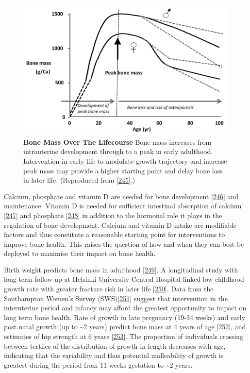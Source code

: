 \documentclass[
]{book}
\begin{document}
\begin{figure}

{\centering \includegraphics[width=0.8\linewidth]{figs/Harvey2014bfig1} 

}

\caption{\textbf{Bone Mass Over The Lifecourse} Bone mass increases from intrauterine development through to a peak in early adulthood. Intervention in early life to modulate growth trajectory and increase peak mass may provide a higher starting point and delay bone loss in later life. (Reproduced from {[}\protect\hyperlink{ref-Harvey2014b}{245}{]}.)}\label{fig:Harvey2014bfig1}
\end{figure}



Calcium, phosphate and vitamin D are needed for bone development {[}\protect\hyperlink{ref-Bikle2012}{246}{]} and maintenance.
Vitamin D is needed for sufficient intestinal absorption of calcium {[}\protect\hyperlink{ref-Christakos2011}{247}{]} and phosphate {[}\protect\hyperlink{ref-Fukumoto2014}{248}{]} in addition to the hormonal role it plays in the regulation of bone development.
Calcium and vitamin D intake are modifiable factors and thus constitute a reasonable starting point for interventions to improve bone health.
This raises the question of how and when they can best be deployed to maximise their impact on bone health.

Birth weight predicts bone mass in adulthood {[}\protect\hyperlink{ref-Baird2011}{249}{]}.
A longitudinal study with long term follow up at Helsinki University Central Hospital linked low childhood growth rate with greater fracture risk in later life {[}\protect\hyperlink{ref-Cooper2001}{250}{]}.
Data from the Southampton Women's Survey (SWS){[}\protect\hyperlink{ref-Inskip2006}{251}{]} suggest that intervention in the interuterine period and infancy may afford the greatest opportunity to impact on long term bone health.
Rate of growth in late pregnancy (19-34 weeks) and early post natal growth (up to \textasciitilde2 years) predict bone mass at 4 years of age {[}\protect\hyperlink{ref-Harvey2010a}{252}{]}, and estimates of hip strength at 6 years {[}\protect\hyperlink{ref-Harvey2013}{253}{]}.
The proportion of individuals crossing between tertiles of the distribution of growth in length decreases with age, indicating that the variability and thus potential malleability of growth is greatest during the period from 11 weeks gestation to \textasciitilde2 years.
\end{document}
